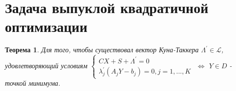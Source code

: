 \documentclass[12pt]{article}
\newtheorem{theorem}{Теорема}[section]
\theoremstyle{definition}
\theoremstyle{remark}
\begin{document}
\section{Задача выпуклой квадратичной оптимизации}

\begin{theorem}
  Для того, чтобы существовал вектор Куна-Таккера $\Lambda^{'}\in \mathcal{L}$, удовлетворяющий условиям $\begin{cases}
    CX+S+\Lambda^{'}=0\\
    \lambda_j^{'}(A_jY-b_j)=0, j=1,...,K
\end{cases}$ $\iff$ $Y\in D$ - точкой минимума.
\end{theorem}
\end{document}
